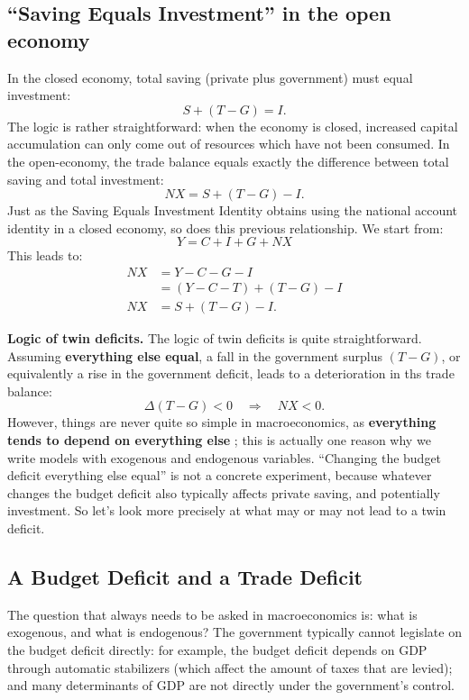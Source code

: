 \documentclass[]{book}
\theoremstyle{definition}
\theoremstyle{definition}
\theoremstyle{definition}
\theoremstyle{remark}
\begin{document}
\subsection{\texorpdfstring{``Saving Equals Investment'' in the open
economy}{Saving Equals Investment in the open economy}}\label{saving-equals-investment-in-the-open-economy}

In the closed economy, total saving (private plus government) must equal
investment: \[S +\left(T-G\right) = I.\] The logic is rather
straightforward: when the economy is closed, increased capital
accumulation can only come out of resources which have not been
consumed. In the open-economy, the trade balance equals exactly the
difference between total saving and total investment:
\[\boxed{NX = S +\left(T-G\right) - I}.\] Just as the Saving Equals
Investment Identity obtains using the national account identity in a
closed economy, so does this previous relationship. We start from:
\[Y = C+I+G+NX\] This leads to: \[
\begin{aligned}
NX &= Y-C-G-I \\
&=\left(Y-C-T\right)+\left(T-G\right)-I\\
NX &= S + \left(T-G\right)-I.
\end{aligned}
\]

\textbf{Logic of twin deficits.} The logic of twin deficits is quite
straightforward. Assuming \textbf{everything else equal}, a fall in the
government surplus \((T-G)\), or equivalently a rise in the government
deficit, leads to a deterioration in ths trade balance:
\[\boxed{\Delta(T-G)<0 \quad \Rightarrow \quad NX<0}.\] However, things
are never quite so simple in macroeconomics, as \textbf{everything tends
to depend on everything else} ; this is actually one reason why we write
models with exogenous and endogenous variables. ``Changing the budget
deficit everything else equal'' is not a concrete experiment, because
whatever changes the budget deficit also typically affects private
saving, and potentially investment. So let's look more precisely at what
may or may not lead to a twin deficit.

\subsection{A Budget Deficit and a Trade
Deficit}\label{a-budget-deficit-and-a-trade-deficit}

The question that always needs to be asked in macroeconomics is: what is
exogenous, and what is endogenous? The government typically cannot
legislate on the budget deficit directly: for example, the budget
deficit depends on GDP through automatic stabilizers (which affect the
amount of taxes that are levied); and many determinants of GDP are not
directly under the government's control.
\end{document}

